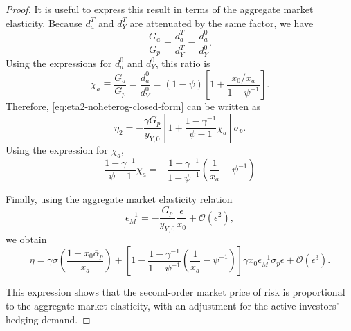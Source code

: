 \begin{proof}
It is useful to express this result in terms of the aggregate market elasticity.
Because $d_a^T$ and $d_Y^T$ are attenuated by the same factor, we have
\begin{equation}
    \frac{G_a}{G_p}=\frac{d_a^T}{d_Y^T}=\frac{d_a^0}{d_Y^0}.
\end{equation}
Using the expressions for $d_a^0$ and $d_Y^0$, this ratio is
\begin{equation}\label{eq:Ga-Gp-ratio-noheterog}
    \chi_a
    \equiv \frac{G_a}{G_p}
    =\frac{d_a^0}{d_Y^0}
    =(1-\psi)
    \left[
        1+\frac{x_0/x_a}{1-\psi^{-1}}
    \right].
\end{equation}
Therefore, \eqref{eq:eta2-noheterog-closed-form} can be written as
\begin{equation}\label{eq:eta2-noheterog-Gp}
    \eta_2
    =-\frac{\gamma G_p}{y_{Y,0}}
    \left[
        1+\frac{1-\gamma^{-1}}{\psi-1}\chi_a
    \right]\sigma_p.
\end{equation}
Using the expression for $\chi_a$,
\begin{equation}
        \frac{1-\gamma^{-1}}{\psi-1}\chi_a
    =
    -\frac{1-\gamma^{-1}}{1-\psi^{-1}} \left(\frac{1}{x_a} - \psi^{-1}\right)
\end{equation}


Finally, using the aggregate market elasticity relation
\begin{equation}
    \epsilon_M^{-1}
    =-\frac{G_p}{y_{Y,0}}\frac{\epsilon}{x_0}
    +\mathcal{O}(\epsilon^2),
\end{equation}
we obtain
\begin{equation}\label{eq:eta2-noheterog-elasticity}
    \eta
    = \gamma \sigma \left( \frac{1- x_0 \overline{\alpha}_p}{x_a}\right)
    +\left[
        1 -\frac{1-\gamma^{-1}}{1-\psi^{-1}} \left(\frac{1}{x_a} - \psi^{-1}\right)
    \right]\gamma x_0\epsilon_M^{-1}\sigma_p\epsilon
    +\mathcal{O}(\epsilon^3).
\end{equation}

This expression shows that the second-order market price of risk is proportional to the aggregate market elasticity, with an adjustment for the active investors' hedging demand.


\end{proof}
